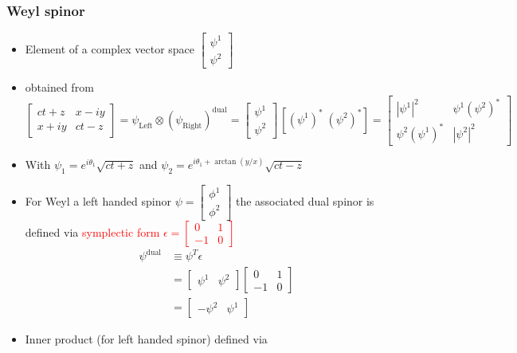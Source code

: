 \documentclass[../main.tex]{subfiles}
\begin{document}
\begin{itemize}
\subsubsection{Weyl spinor}
\begin{itemize}
\item Element of a complex vector space $\left[\begin{matrix}
\psi^1\\ \psi^2
\end{matrix}\right]$
\item obtained from $\left[\begin{matrix}
ct+z  & x-iy\\
x+iy & ct-z
\end{matrix}\right]
=\psi_\text{Left}\otimes(\psi_\text{Right})^\text{dual}
=\left[\begin{matrix}
\psi^1\\ \psi^2
\end{matrix}\right] \,[(\psi^1)^*\;(\psi^2)^*]=\left[\begin{matrix}
|\psi^1|^2 & \psi^1(\psi^2)^*\\
\psi^2(\psi^1)^*  & |\psi^2|^2
\end{matrix}\right] $
\item With $\psi_1=e^{i\theta_1}\sqrt{ct+z}$ and $\psi_2=e^{i\theta_1+\arctan(y/x)}\sqrt{ct-z}$
\item For Weyl a left handed spinor $\psi=\left[\begin{matrix}\phi^1\\\phi^2\end{matrix}\right]$ the associated dual spinor is defined via \textcolor{red}{symplectic form $\epsilon=\left[\begin{matrix}0&1\\-1&0\end{matrix}\right]$}
\begin{align}
\psi^\text{dual}
&\equiv\psi^T\epsilon\\
&=\left[\begin{matrix}\psi^1&\psi^2\end{matrix}\right]
\left[\begin{matrix}0&1\\-1&0\end{matrix}\right]\\
&=\left[\begin{matrix}-\psi^2&\psi^1\end{matrix}\right]
\end{align}
\item Inner product (for left handed spinor) defined via

\end{itemize}
\end{itemize}
\end{document}
